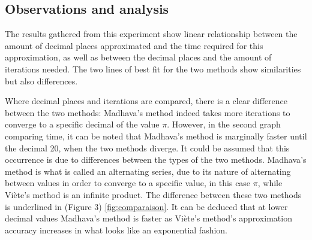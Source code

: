 



\subsection{Observations and analysis}

The results gathered from this experiment show linear relationship between the amount of decimal 
places approximated and the time required for this approximation, as well as between the decimal places 
and the amount of iterations needed. The two lines of best fit for the two methods show 
similarities but also differences.

Where decimal places and iterations are compared, there is a clear difference between the two 
methods: Madhava's method indeed takes more iterations to converge to a specific decimal of 
the value $\pi$. However, in the second graph comparing time, it can be noted that Madhava's 
method is marginally faster until the decimal 20, when the two methods diverge. It could be 
assumed that this occurrence is due to differences between the types of the two methods. Madhava's 
method is what is called an alternating series, due to its nature of alternating between values in order 
to converge to a specific value, in this case $\pi$, while Viète's method is an infinite product. The 
difference between these two methods is underlined in (Figure 3) \ref{fig:comparaison}. It can be 
deduced that at lower decimal values Madhava's method is faster as Viète's method's approximation 
accuracy increases in what looks like an exponential fashion. 

